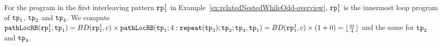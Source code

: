   For the program in the first interleaving pattern $\mathtt{rp}_1^1$ in Example~\ref{ex:relatedNestedWhileOdd-overview}, $\mathtt{rp}_1^1$ is the innermost loop program of $\mathtt{tp}_1$, $\mathtt{tp}_2$ and $\mathtt{tp}_4$.
  We compute $\mathtt{pathLocRB}(\mathtt{rp}_1^1, \mathtt{tp}_1) = BD(\mathtt{rp}_1^1, c) \times \mathtt{pathLocRB}(\mathtt{tp}_1; 4:\mathtt{repeat}(\mathtt{tp}_3); \mathtt{tp}_2; \mathtt{tp}_4, \mathtt{tp}_1)
  = BD(\mathtt{rp}_1^1, c) \times (1 + 0) = \lfloor \frac{m}{4} \rfloor $ and the same for $\mathtt{tp}_2$ and $\mathtt{tp}_4$.


